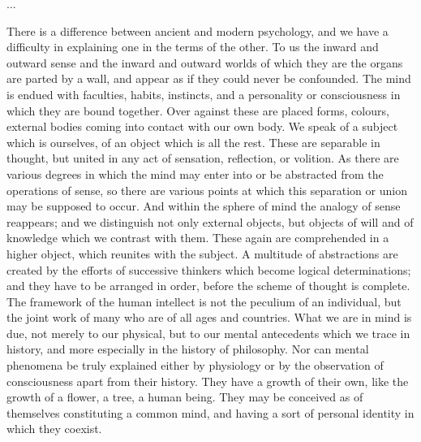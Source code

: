 \documentclass[11pt,letter]{article}
\begin{document}
\par  ...

\par  There is a difference between ancient and modern psychology, and we have a difficulty in explaining one in the terms of the other. To us the inward and outward sense and the inward and outward worlds of which they are the organs are parted by a wall, and appear as if they could never be confounded. The mind is endued with faculties, habits, instincts, and a personality or consciousness in which they are bound together. Over against these are placed forms, colours, external bodies coming into contact with our own body. We speak of a subject which is ourselves, of an object which is all the rest. These are separable in thought, but united in any act of sensation, reflection, or volition. As there are various degrees in which the mind may enter into or be abstracted from the operations of sense, so there are various points at which this separation or union may be supposed to occur. And within the sphere of mind the analogy of sense reappears; and we distinguish not only external objects, but objects of will and of knowledge which we contrast with them. These again are comprehended in a higher object, which reunites with the subject. A multitude of abstractions are created by the efforts of successive thinkers which become logical determinations; and they have to be arranged in order, before the scheme of thought is complete. The framework of the human intellect is not the peculium of an individual, but the joint work of many who are of all ages and countries. What we are in mind is due, not merely to our physical, but to our mental antecedents which we trace in history, and more especially in the history of philosophy. Nor can mental phenomena be truly explained either by physiology or by the observation of consciousness apart from their history. They have a growth of their own, like the growth of a flower, a tree, a human being. They may be conceived as of themselves constituting a common mind, and having a sort of personal identity in which they coexist.
\end{document}
